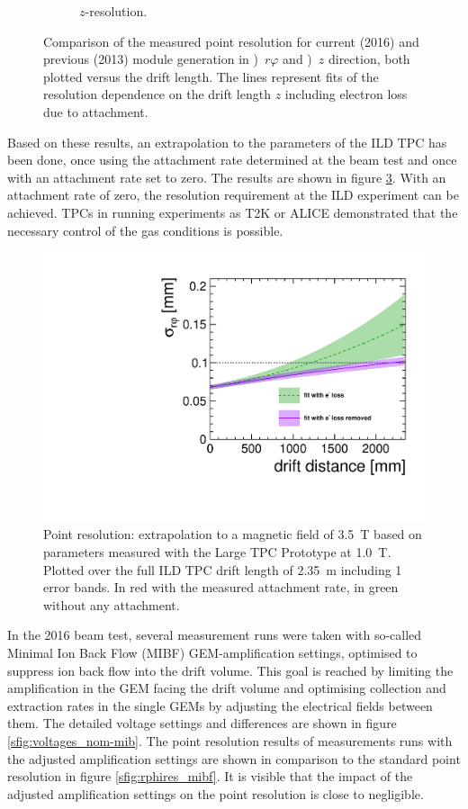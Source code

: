 \begin{figure}
\begin{subfigure}[b]{0.48\textwidth}
\caption{$z$-resolution.}
\label{sfig:pres_13-16_z}
\end{subfigure}
\caption{Comparison of the measured point resolution for current (2016) and previous (2013) module generation in \protect{})~$r\varphi$ and \protect{})~$z$ direction, both plotted versus the drift length.
  The lines represent fits of the resolution dependence on the drift length $z$ including electron loss due to attachment.
}
\label{fig:pointresolution}
\end{figure}

Based on these results, an extrapolation to the parameters of the ILD TPC has been done, once using the attachment rate determined at the beam test and once with an attachment rate set to zero. 
The results are shown in figure \ref{fig:resextrapol}. 
With an attachment rate of zero, the resolution requirement at the ILD experiment can be achieved. 
TPCs in running experiments as T2K or ALICE demonstrated that the necessary control of the gas conditions is possible.

\begin{figure}
    \centering
    \includegraphics[height=0.4\textwidth]{Tracker/TPC_Bonn/plots/TPC-DG_resolutionExtrapolation2016_v2.pdf}
    \caption{Point resolution: extrapolation to a magnetic field of \SI{3.5}{T} based on parameters measured with the Large TPC Prototype at \SI{1.0}{T}. Plotted over the full ILD TPC drift length of \SI{2.35}{m} including 1 \sigma error bands. In red with the measured attachment rate, in green without any attachment.}
    \label{fig:resextrapol}
\end{figure}

In the 2016 beam test, several measurement runs were taken with so-called Minimal Ion Back Flow (MIBF) GEM-amplification settings, optimised to suppress ion back flow into the drift volume.
This goal is reached by limiting the amplification in the GEM facing the drift volume and optimising collection and extraction rates in the single GEMs by adjusting the electrical fields between them.
The detailed voltage settings and differences are shown in figure \ref{sfig:voltages_nom-mib}. 
The point resolution results of measurements runs with the adjusted amplification settings are shown in comparison to the standard point resolution in figure \ref{sfig:rphires_mibf}. 
It is visible that the impact of the adjusted amplification settings on the point resolution is close to negligible.

